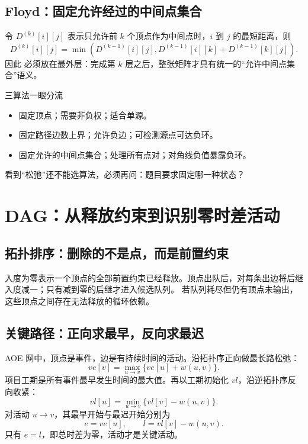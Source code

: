 \documentclass[UTF8,fontset=none,11pt,a4paper]{ctexart}
\begin{document}
\subsection{Floyd：固定允许经过的中间点集合}
令 $D^{(k)}[i][j]$ 表示只允许前 $k$ 个顶点作为中间点时，$i$ 到 $j$ 的最短距离，则
\[
D^{(k)}[i][j]
=\min\left(D^{(k-1)}[i][j],
D^{(k-1)}[i][k]+D^{(k-1)}[k][j]\right).
\]
因此  必须放在最外层：完成第 $k$ 层之后，整张矩阵才具有统一的“允许中间点集合”语义。



\begin{methodbox}{三算法一眼分流}
\begin{itemize}
  \item {}固定顶点；需要非负权；适合单源。
  \item {}固定路径边数上界；允许负边；可检测源点可达负环。
  \item {}固定允许的中间点集合；处理所有点对；对角线负值暴露负环。
\end{itemize}
看到“松弛”还不能选算法，必须再问：题目要求固定哪一种状态？
\end{methodbox}

\section{DAG：从释放约束到识别零时差活动}

\subsection{拓扑排序：删除的不是点，而是前置约束}
入度为零表示一个顶点的全部前置约束已经释放。顶点出队后，对每条出边将后继入度减一；只有减到零的后继才进入候选队列。
若队列耗尽但仍有顶点未输出，这些顶点之间存在无法释放的循环依赖。



\subsection{关键路径：正向求最早，反向求最迟}
AOE 网中，顶点是事件，边是有持续时间的活动。沿拓扑序正向做最长路松弛：
\[
ve[v]=\max_{u\to v}\{ve[u]+w(u,v)\}.
\]
项目工期是所有事件最早发生时间的最大值。再以工期初始化 $vl$，沿逆拓扑序反向收紧：
\[
vl[u]=\min_{u\to v}\{vl[v]-w(u,v)\}.
\]
对活动 $u\to v$，其最早开始与最迟开始分别为
\[
e=ve[u],\qquad l=vl[v]-w(u,v).
\]
只有 $e=l$，即总时差为零，活动才是关键活动。
\end{document}

